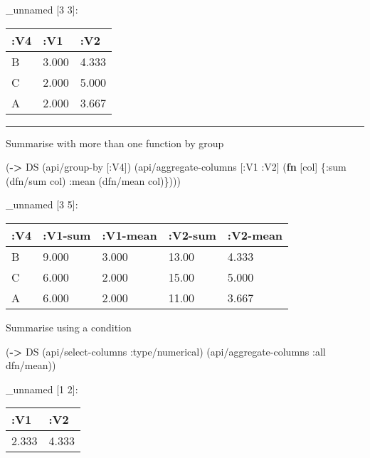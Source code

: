 \documentclass[]{article}
\newenvironment{Shaded}{\begin{snugshade}}{\end{snugshade}}
\newcommand{\KeywordTok}[1]{\textcolor[rgb]{0.13,0.29,0.53}{\textbf{#1}}}
\newcommand{\AttributeTok}[1]{\textcolor[rgb]{0.77,0.63,0.00}{#1}}
\newcommand{\NormalTok}[1]{#1}
\begin{document}
\_unnamed {[}3 3{]}:

\begin{longtable}[]{@{}lll@{}}
\toprule
:V4 & :V1 & :V2\tabularnewline
\midrule
\endhead
B & 3.000 & 4.333\tabularnewline
C & 2.000 & 5.000\tabularnewline
A & 2.000 & 3.667\tabularnewline
\bottomrule
\end{longtable}

\begin{center}\rule{0.5\linewidth}{0.5pt}\end{center}

Summarise with more than one function by group

\begin{Shaded}
\begin{Highlighting}[]
\NormalTok{(}\KeywordTok{->}\NormalTok{ DS}
\NormalTok{    (api/group-by [}\AttributeTok{:V4}\NormalTok{])}
\NormalTok{    (api/aggregate-columns [}\AttributeTok{:V1} \AttributeTok{:V2}\NormalTok{] (}\KeywordTok{fn}\NormalTok{ [col]}
\NormalTok{                                       \{}\AttributeTok{:sum}\NormalTok{ (dfn/sum col)}
                                        \AttributeTok{:mean}\NormalTok{ (dfn/mean col)\})))}
\end{Highlighting}
\end{Shaded}

\_unnamed {[}3 5{]}:

\begin{longtable}[]{@{}lllll@{}}
\toprule
:V4 & :V1-sum & :V1-mean & :V2-sum & :V2-mean\tabularnewline
\midrule
\endhead
B & 9.000 & 3.000 & 13.00 & 4.333\tabularnewline
C & 6.000 & 2.000 & 15.00 & 5.000\tabularnewline
A & 6.000 & 2.000 & 11.00 & 3.667\tabularnewline
\bottomrule
\end{longtable}

Summarise using a condition

\begin{Shaded}
\begin{Highlighting}[]
\NormalTok{(}\KeywordTok{->}\NormalTok{ DS}
\NormalTok{    (api/select-columns }\AttributeTok{:type/numerical}\NormalTok{)}
\NormalTok{    (api/aggregate-columns }\AttributeTok{:all}\NormalTok{ dfn/mean))}
\end{Highlighting}
\end{Shaded}

\_unnamed {[}1 2{]}:

\begin{longtable}[]{@{}ll@{}}
\toprule
:V1 & :V2\tabularnewline
\midrule
\endhead
2.333 & 4.333\tabularnewline
\bottomrule
\end{longtable}
\end{document}

